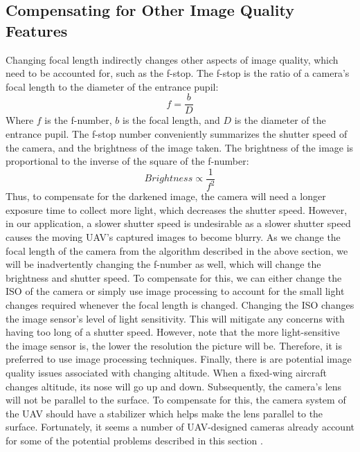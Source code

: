 \documentclass[conference]{IEEEtran}
\theoremstyle{plain}%
\begin{document}
\subsection{Compensating for Other Image Quality Features}
Changing focal length indirectly changes other aspects of image quality, which need to be accounted for, such as the f-stop. The f-stop is the ratio of a camera's focal length to the diameter of the entrance pupil:
\begin{equation} \label{eq:f_stop}
f=\frac{b}{D}
\end{equation}
Where $f$ is the f-number, $b$ is the focal length, and $D$ is the diameter of the entrance pupil.
The f-stop number conveniently summarizes the shutter speed of the camera, and the brightness of the image taken.
The brightness of the image is proportional to the inverse of the square of the f-number:
\begin{equation}
Brightness \propto \frac{1}{f^2}
\end{equation}
Thus, to compensate for the darkened image, the camera will need a longer exposure time to collect more light, which decreases the shutter speed. However, in our application, a slower shutter speed is undesirable as a slower shutter speed causes the moving UAV's captured images to become blurry.
As we change the focal length of the camera from the algorithm described in the above section, we will be inadvertently changing the f-number as well, which will change the brightness and shutter speed.
To compensate for this, we can either change the ISO of the camera or simply use image processing to account for the small light changes required whenever the focal length is changed. Changing the ISO changes the image sensor's level of light sensitivity. This will mitigate any concerns with having too long of a shutter speed. However, note that the more light-sensitive the image sensor is, the lower the resolution the picture will be. Therefore, it is preferred to use image processing techniques.
Finally, there is are potential image quality issues associated with changing altitude. When a fixed-wing aircraft changes altitude, its nose will go up and down. Subsequently, the camera's lens will not be parallel to the surface. To compensate for this, the camera system of the UAV should have a stabilizer which helps make the lens parallel to the surface.
Fortunately, it seems a number of UAV-designed cameras already account for some of the potential problems described in this section \cite{imperx:aerial}.
\end{document}
